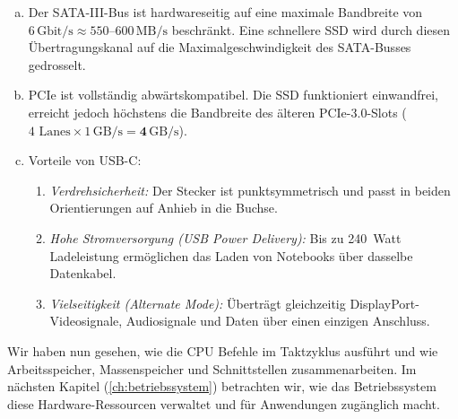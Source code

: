 \begin{myexercise}
\begin{myanswer}
\begin{enumerate}[(a)]
\begin{itemize}
                \item \textbf{6 $\to$ F:} Maus und Tastatur übertragen lediglich minimale Steuersignale (wenige Kilobytes/s); der bewährte \gls{USB}-A-Anschluss ist hierfür Standard.
            \end{itemize}
            \item Der \gls{SATA}-III-Bus ist hardwareseitig auf eine maximale Bandbreite von $6\,\mathrm{Gbit/s} \approx 550\text{--}600\,\mathrm{MB/s}$ beschränkt. Eine schnellere \gls{SSD} wird durch diesen Übertragungskanal auf die Maximalgeschwindigkeit des \gls{SATA}-Busses gedrosselt.
            \item \gls{PCIe} ist vollständig abwärtskompatibel. Die \gls{SSD} funktioniert einwandfrei, erreicht jedoch höchstens die Bandbreite des älteren \gls{PCIe}-3.0-Slots ($4 \text{ Lanes} \times 1\,\mathrm{GB/s} = \mathbf{4\,\mathrm{GB/s}}$).
            \item Vorteile von \gls{USB}-C:
            \begin{enumerate}[1.]
                \item \emph{Verdrehsicherheit:} Der Stecker ist punktsymmetrisch und passt in beiden Orientierungen auf Anhieb in die Buchse.
                \item \emph{Hohe Stromversorgung (\gls{USB} Power Delivery):} Bis zu 240~Watt Ladeleistung ermöglichen das Laden von Notebooks über dasselbe Datenkabel.
                \item \emph{Vielseitigkeit (Alternate Mode):} Überträgt gleichzeitig Display\-Port-Video\-signale, Audiosignale und Daten über einen einzigen Anschluss.
            \end{enumerate}
        \end{enumerate}
    \end{myanswer}
\end{myexercise}

Wir haben nun gesehen, wie die \gls{CPU} Befehle im Taktzyklus ausführt und wie Arbeitsspeicher, Massenspeicher und Schnittstellen zusammenarbeiten. Im nächsten Kapitel (\cref{ch:betriebssystem}) betrachten wir, wie das Betriebssystem diese Hardware-Ressourcen verwaltet und für Anwendungen zugänglich macht.
